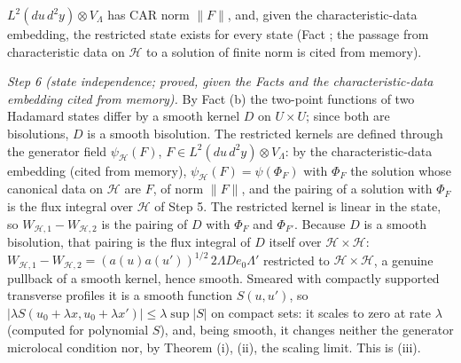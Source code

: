 $L^{2}(du\,d^{2}y)\otimes V_{\Lambda}$ has CAR norm $\|F\|$, and, given the characteristic-data embedding, the restricted state exists for every state (Fact ; the passage from characteristic data on $\mathcal{H}$ to a solution of finite norm is cited from memory).

\emph{Step 6 (state independence; proved, given the Facts and the characteristic-data embedding cited from memory).} By Fact (b) the two-point functions of two Hadamard states differ by a smooth kernel $D$ on $U\times U$; since both are bisolutions, $D$ is a smooth bisolution. The restricted kernels are defined through the generator field $\psi_{\mathcal{H}}(F)$, $F \in L^{2}(du\,d^{2}y)\otimes V_{\Lambda}$: by the characteristic-data embedding (cited from memory), $\psi_{\mathcal{H}}(F) = \psi(\Phi_{F})$ with $\Phi_{F}$ the solution whose canonical data on $\mathcal{H}$ are $F$, of norm $\|F\|$, and the pairing of a solution with $\Phi_{F}$ is the flux integral over $\mathcal{H}$ of Step 5. The restricted kernel is linear in the state, so $W_{\mathcal{H},1} - W_{\mathcal{H},2}$ is the pairing of $D$ with $\Phi_{F}$ and $\Phi_{F'}$. Because $D$ is a smooth bisolution, that pairing is the flux integral of $D$ itself over $\mathcal{H}\times\mathcal{H}$: $W_{\mathcal{H},1} - W_{\mathcal{H},2} = (a(u)a(u'))^{1/2}\,2\Lambda D e_{0}\Lambda'$ restricted to $\mathcal{H}\times\mathcal{H}$, a genuine pullback of a smooth kernel, hence smooth. Smeared with compactly supported transverse profiles it is a smooth function $S(u, u')$, so $|\lambda S(u_{0} + \lambda x, u_{0} + \lambda x')| \le \lambda\sup|S|$ on compact sets: it scales to zero at rate $\lambda$ (computed for polynomial $S$), and, being smooth, it changes neither the generator microlocal condition nor, by Theorem (i), (ii), the scaling limit. This is (iii).

